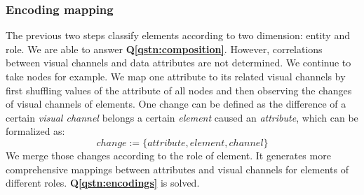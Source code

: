 \subsubsection{Encoding mapping}\label{sec:encodingmapping}
The previous two steps classify elements according to two dimension: entity and role.
We are able to answer \textbf{Q\ref{qstn:composition}}.
However, correlations between visual channels and data attributes are not determined.
We continue to take nodes for example.
We map one attribute to its related visual channels by first shuffling values of the attribute of all nodes and then observing the changes of visual channels of elements.
One change can be defined as the difference of a certain \textit{visual channel} belongs a certain \textit{element} caused an \textit{attribute}, which can be formalized as:
\begin{equation}
    change := \{ attribute, element, channel \}
\end{equation}
We merge those changes according to the role of element.
It generates more comprehensive mappings between attributes and visual channels for elements of different roles.
\textbf{Q\ref{qstn:encodings}} is solved.


